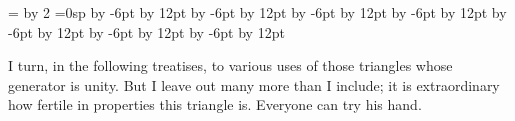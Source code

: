 =\hsize
\divide{} by 2
=0sp
   \advance{} by -6pt \advance{} by 12pt %
\advance{} by -6pt \advance{} by 12pt %
\advance{} by -6pt \advance{} by 12pt %
\advance{} by -6pt \advance{} by 12pt %
\advance{} by -6pt \advance{} by 12pt %
\advance{} by -6pt \advance{} by 12pt %
\advance{} by -6pt \advance{} by 12pt %

I turn, in the following treatises, to various uses of those triangles whose generator
is unity. But I leave out many more than I include; it is extraordinary how fertile in
properties this triangle is. Everyone can try his hand.


\bye
